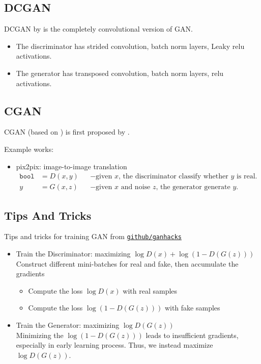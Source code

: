 \subsection{DCGAN}
\ac{DCGAN} by  is the completely convolutional version of \ac{GAN}.
\begin{itemize}
	\item The discriminator has strided convolution, batch norm layers, Leaky \ac{relu} activations.
	\item The generator has transposed convolution, batch norm layers, \ac{relu} activations.
\end{itemize}

\todo{}

\subsection{CGAN}
\ac{CGAN} (based on ) is first proposed by .

Example works:
\begin{itemize}
	\item pix2pix: image-to-image translation \cite{isola2017image}
	\begin{align}
		\texttt{bool} &= D(x,y) &&-\text{given $x$, the discriminator classify whether $y$ is real.}\\
		y &= G(x,z) &&-\text{given $x$ and noise $z$, the generator generate $y$.}
	\end{align}
\end{itemize}

\subsection{Tips And Tricks}
Tips and tricks for training \ac{GAN} from \href{https://github.com/soumith/ganhacks}{\texttt{github/ganhacks}}
\begin{itemize}
	\item Train the Discriminator: maximizing $\log D(x) + \log (1-D(G(z)))$\\
	Construct different mini-batches for real and fake, then accumulate the gradients
	\begin{itemize}
		\item Compute the loss $\log D(x)$ with real samples
		\item Compute the loss $\log (1 - D(G(z)))$ with fake samples
	\end{itemize}
	\item Train the Generator: maximizing $\log D (G(z))$\\
	Minimizing the $\log(1 - D(G(z)))$ leads to insufficient gradients, especially in early learning process. Thus, we instead maximize $\log D (G(z))$.
\end{itemize}

